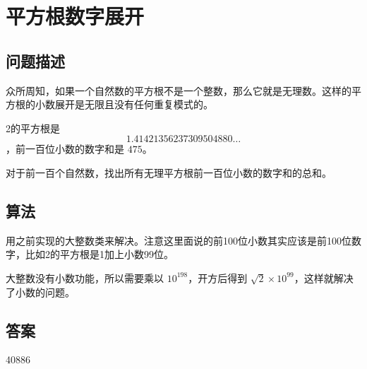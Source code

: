 \section{平方根数字展开}\label{sec:problem80}
\subsection{问题描述}
\begin{tcolorbox}
	众所周知，如果一个自然数的平方根不是一个整数，那么它就是无理数。这样的平方根的小数展开是无限且没有任何重复模式的。

	2的平方根是
	\[1.41421356237309504880 \ldots\]
	，前一百位小数的数字和是 \(475\)。

	对于前一百个自然数，找出所有无理平方根前一百位小数的数字和的总和。

\end{tcolorbox}

\subsection{算法}
用之前实现的大整数类来解决。注意这里面说的前100位小数其实应该是前100位数字，比如2的平方根是1加上小数99位。

大整数没有小数功能，所以需要乘以 $ 10^198 $，开方后得到 $ \sqrt{2} \times 10^99 $，这样就解决了小数的问题。

\subsection{答案}
40886
